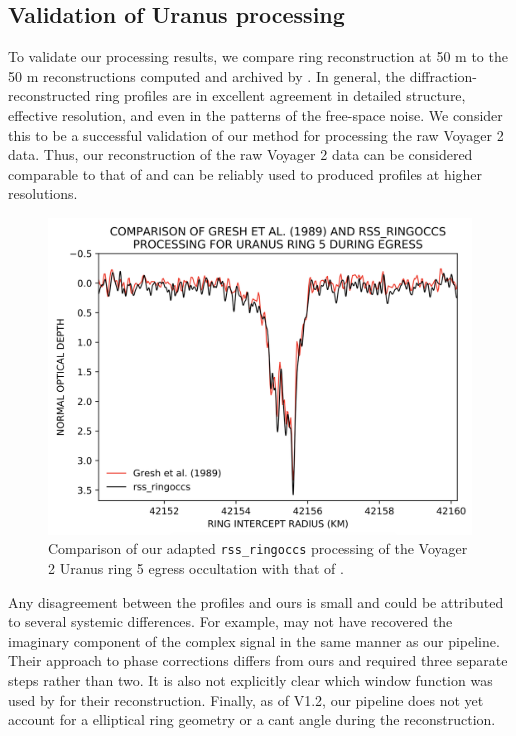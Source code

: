 \documentclass[titlepage, 12pt]{article}
\begin{document}
           \subsection{Validation of Uranus processing}
           To validate our processing results, we compare ring reconstruction at 50 m to the 50 m 
           reconstructions computed and archived by \citet{Gresh1989}. In general, the diffraction-reconstructed ring profiles are in excellent agreement in detailed structure, effective resolution, and even in the patterns of the free-space noise. We consider this to be a
           successful validation of our method for processing the raw Voyager 2 data. Thus, our
           reconstruction of the raw Voyager 2 data can be considered comparable to that of
           \citet{Gresh1989} and can be reliably used to produced profiles at higher resolutions.
           \begin{figure}[H]
            \centering
            \includegraphics[width=0.75\linewidth]{figs/GRESH_E5_COMPARE.png}
            \caption{Comparison of our adapted \texttt{rss\_ringoccs} processing of the Voyager 2 Uranus ring 5 egress occultation with that of \citet{Gresh1989}.}
           \end{figure}
           Any disagreement between the \citet{Gresh1989} profiles and ours is small and could
           be attributed to several systemic differences. For example, \citet{Gresh1989} may not have
           recovered the imaginary component of the complex signal in the same manner as our
           pipeline. Their approach to phase corrections differs from ours and required three
           separate steps rather than two. It is also not explicitly clear which window function was used by 
           \citet{Gresh1989} for their reconstruction. Finally, as of V1.2, our pipeline 
           does not yet account for a elliptical ring geometry or a cant angle during the reconstruction.
\end{document}
